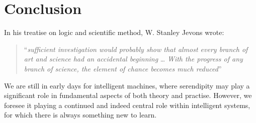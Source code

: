 \section{Conclusion}

In his treatise on logic and scientific method, W. Stanley Jevons
wrote:
\begin{quote}
``\emph{sufficient investigation would probably show that almost every
    branch of art and science had an accidental beginning} \ldots
  \emph{With the progress of any branch of science, the element of
    chance becomes much reduced}'' \cite[p. 531]{jevons:1877}
\end{quote}
We are still in early days for intelligent machines, where serendipity
may play a significant role in fundamental aspects of both theory and
practise.  However, we foresee it playing a continued and indeed
central role within intelligent systems, for which there is always
something new to learn.
